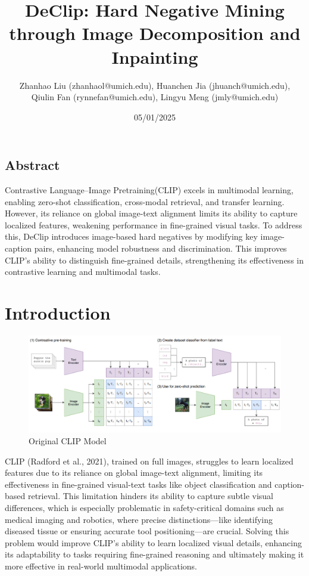 \documentclass[11pt,letterpaper]{article}
\begin{document}
\title{DeClip: Hard Negative Mining through Image Decomposition and Inpainting}


\author{
Zhanhao Liu (zhanhaol@umich.edu),
Huanchen Jia (jhuanch@umich.edu),\\
Qiulin Fan (rynnefan@umich.edu),
Lingyu Meng (jmly@umich.edu)\\
}

\date{05/01/2025}


\maketitle
\begin{center}
    \section*{Abstract}
\end{center}
Contrastive Language–Image Pretraining(CLIP) excels in multimodal learning, enabling zero-shot classification, cross-modal retrieval, and transfer learning. However, its reliance on global image-text alignment limits its ability to capture localized features, weakening performance in fine-grained visual tasks.\cite{liu2024an} To address this, DeClip introduces image-based hard negatives by modifying key image-caption pairs, enhancing model robustness and discrimination. This improves CLIP’s ability to distinguish fine-grained details, strengthening its effectiveness in contrastive learning and multimodal tasks.\\
\section{Introduction}
\begin{figure}[h]
    \centering
    \includegraphics[width=0.65\linewidth]{final_report/assets/openai_clip.png} 
    \caption{Original CLIP Model}
    \label{fig:Original_CLIP_Model}
\end{figure}

CLIP\cite{radford2021learningtransferablevisualmodels} (Radford et al., 2021), trained on full images, struggles to learn localized features due to its reliance on global image-text alignment, limiting its effectiveness in fine-grained visual-text tasks like object classification and caption-based retrieval. This limitation hinders its ability to capture subtle visual differences, which is especially problematic in safety-critical domains such as medical imaging and robotics, where precise distinctions—like identifying diseased tissue or ensuring accurate tool positioning—are crucial. Solving this problem would improve CLIP’s ability to learn localized visual details, enhancing its adaptability to tasks requiring fine-grained reasoning and ultimately making it more effective in real-world multimodal applications.
\end{document}
